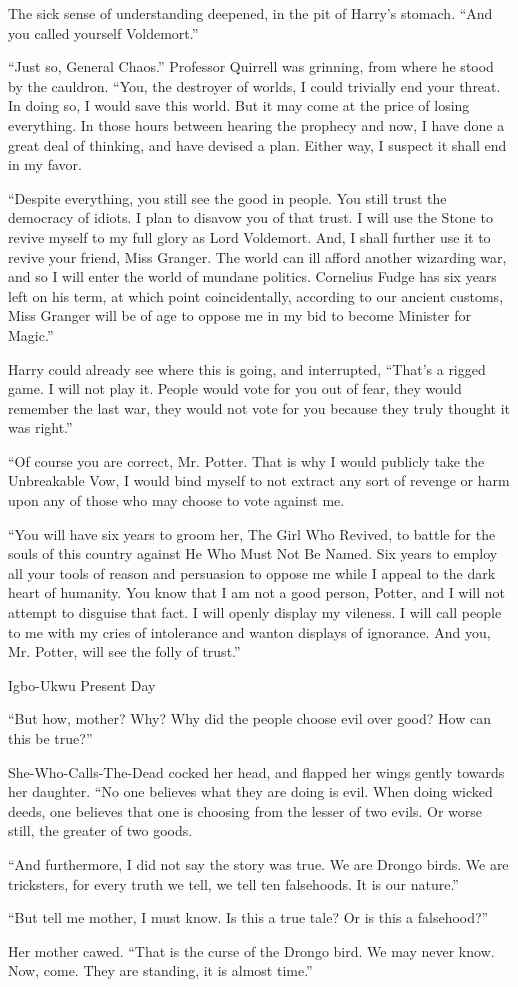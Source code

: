 The sick sense of understanding deepened, in the pit of Harry’s stomach. “And you called yourself Voldemort.”

“Just so, General Chaos.” Professor Quirrell was grinning, from where he stood by the cauldron. “You, the destroyer of worlds, I could trivially end your threat. In doing so, I would save this world. But it may come at the price of losing everything. In those hours between hearing the prophecy and now, I have done a great deal of thinking, and have devised a plan. Either way, I suspect it shall end in my favor.

“Despite everything, you still see the good in people. You still trust the democracy of idiots. I plan to disavow you of that trust. I will use the Stone to revive myself to my full glory as Lord Voldemort. And, I shall further use it to revive your friend, Miss Granger. The world can ill afford another wizarding war, and so I will enter the world of mundane politics. Cornelius Fudge has six years left on his term, at which point coincidentally, according to our ancient customs, Miss Granger will be of age to oppose me in my bid to become Minister for Magic.”

Harry could already see where this is going, and interrupted, “That’s a rigged game. I will not play it. People would vote for you out of fear, they would remember the last war, they would not vote for you because they truly thought it was right.”

“Of course you are correct, Mr. Potter. That is why I would publicly take the Unbreakable Vow, I would bind myself to not extract any sort of revenge or harm upon any of those who may choose to vote against me.

“You will have six years to groom her, The Girl Who Revived, to battle for the souls of this country against He Who Must Not Be Named. Six years to employ all your tools of reason and persuasion to oppose me while I appeal to the dark heart of humanity. You know that I am not a good person, Potter, and I will not attempt to disguise that fact. I will openly display my vileness. I will call people to me with my cries of intolerance and wanton displays of ignorance. And you, Mr. Potter, will see the folly of trust.”

Igbo-Ukwu 
Present Day

“But how, mother? Why? Why did the people choose evil over good? How can this be true?”

She-Who-Calls-The-Dead cocked her head, and flapped her wings gently towards her daughter. “No one believes what they are doing is evil. When doing wicked deeds, one believes that one is choosing from the lesser of two evils. Or worse still, the greater of two goods.

“And furthermore, I did not say the story was true. We are Drongo birds. We are tricksters, for every truth we tell, we tell ten falsehoods. It is our nature.”

“But tell me mother, I must know. Is this a true tale? Or is this a falsehood?”

Her mother cawed. “That is the curse of the Drongo bird. We may never know. Now, come. They are standing, it is almost time.”